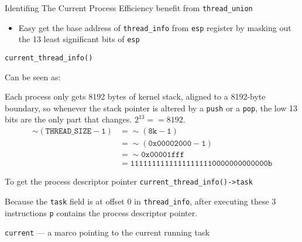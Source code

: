 \begin{frame}{Identifing The Current Process}
    Efficiency benefit from \texttt{thread\_union}
    \begin{itemize}
    \item Easy get the base address of \texttt{thread\_info} from \texttt{esp} register by
      masking out the 13 least significant bits of \texttt{esp}
    \end{itemize}
    \begin{block}{\texttt{current\_thread\_info()}}
      \begin{center}
      \end{center}
      Can be seen as:
      \begin{center}
      \end{center}
    \end{block}
\end{frame}

Each process only gets 8192 bytes of kernel stack, aligned to a 8192-byte boundary, so
whenever the stack pointer is altered by a \texttt{push} or a \texttt{pop}, the low 13 bits
are the only part that changes. $2^{13} == 8192$. 
\begin{equation*}
  \begin{split}
    \sim(\mathtt{THREAD\_SIZE - 1}) &= \sim(\mathtt{8k - 1}) \\
    &= \sim(\mathtt{0x00002000 - 1}) \\
    &= \sim\mathtt{0x00001fff} \\
    &= \mathtt{11111111111111111110000000000000b}
  \end{split}
\end{equation*}

\begin{frame}
  \begin{block}{To get the process descriptor pointer}
    \texttt{current\_thread\_info()->task}
    \begin{center}
    \end{center}
    Because the \texttt{task} field is at offset 0 in \texttt{thread\_info}, after executing
    these 3 instructions \texttt{p} contains the process descriptor pointer.
  \end{block}
  \begin{block}{\texttt{current} --- a marco pointing to the current running task}
    \begin{center}
    \end{center}
  \end{block}
\end{frame}

